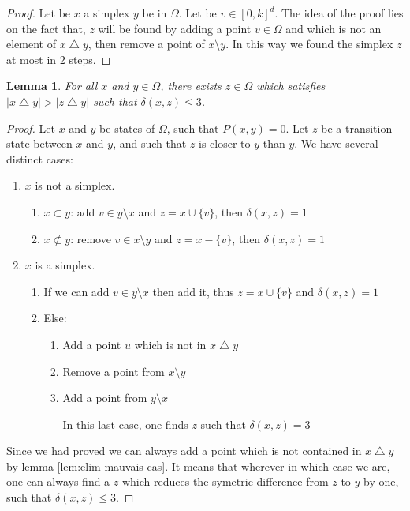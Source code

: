 \documentclass[a4paper]{article}
\newtheorem{lemma}{Lemma}
\begin{document}
\begin{proof}
Let be $x$ a simplex $y$ be in $\Omega$. Let be $v \in [0,k]^d$. The idea of the proof lies on the fact that, $z$ will be found by adding a point $v \in \Omega$ and which is not an element of $x \bigtriangleup y$, then remove a point of $x \setminus y$. In this way we found the simplex $z$ at most in 2 steps.
\end{proof}

\begin{lemma}\label{lem:irreducibility}
  For all $x$ and $y \in \Omega$, there exists $z \in \Omega$ which satisfies $|x \bigtriangleup y| > |z \bigtriangleup y|$ such that $\delta(x,z)\leq{3}$.
\end{lemma}

\begin{proof}
  Let $x$ and $y$ be states of $\Omega$, such that $P(x,y)=0$. Let $z$ be a transition state between $x$ and $y$, and such that $z$ is closer to $y$ than $y$. We have several distinct cases:

  \begin{enumerate}
    \item $x$ is not a simplex.
    \begin{enumerate}
      \item $x \subset y$: add $v \in y \setminus x$ and $z = x \cup \{v\}$, then $\delta(x,z) = 1$
      \item $x \not\subset y$: remove $v \in x \setminus y$ and $z = x - \{v\}$, then $\delta(x,z) = 1$
    \end{enumerate}
    \item $x$ is a simplex.
    \begin{enumerate}
      \item If we can add $v \in y \setminus x$ then add it, thus $z = x \cup \{v\}$ and $\delta(x,z) = 1$
      \item Else:
      \begin{enumerate}
        \item Add a point $u$ which is not in $x \bigtriangleup y$
        \item Remove a point from  $x \setminus y$
        \item Add  a point from $y \setminus x$

        In this last case, one finds $z$ such that $\delta(x,z) = 3$
      \end{enumerate}
    \end{enumerate}
  \end{enumerate}

  Since we had proved we can always add a point which is not contained in $x \bigtriangleup y$ by lemma \ref{lem:elim-mauvais-cas}. It means that wherever in which case we are, one can always find a $z$ which reduces the symetric difference from $z$ to $y$ by one, such that $\delta(x,z) \leq{3}$.

\end{proof}
\end{document}
